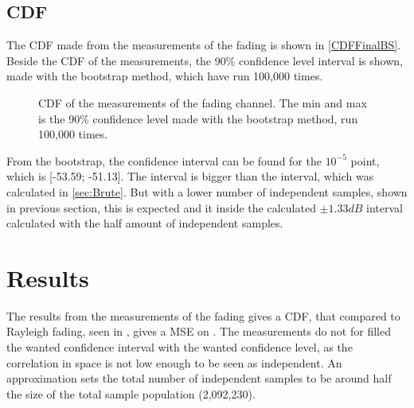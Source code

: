 \subsection{CDF}
The CDF made from the measurements of the fading is shown in \autoref{CDFFinalBS}. Beside the CDF of the measurements, the 90\% confidence level interval is shown, made with the bootstrap method, which have run 100,000 times.

\begin{figure}[H]


\caption{CDF of the measurements of the fading channel. The min and max is the 90\% confidence level made with the bootstrap method, run 100,000 times.}
\label{CDFFinalBS}
\end{figure}

From the bootstrap, the confidence interval can be found for the $10^{-5}$ point, which is [-53.59; -51.13]. The interval is bigger than the interval, which was calculated in \autoref{sec:Brute}. But with a lower number of independent samples, shown in previous section, this is expected and it inside the calculated $\pm 1.33dB$ interval calculated with the half amount of independent samples.


\section{Results}
The results from the measurements of the fading gives a CDF, that compared to Rayleigh fading, seen in , gives a MSE on . The measurements do not for filled the wanted confidence interval with the wanted confidence level, as the correlation in space is not low enough to be seen as independent. An approximation sets the total number of independent samples to be around half the size of the total sample population (2,092,230).








